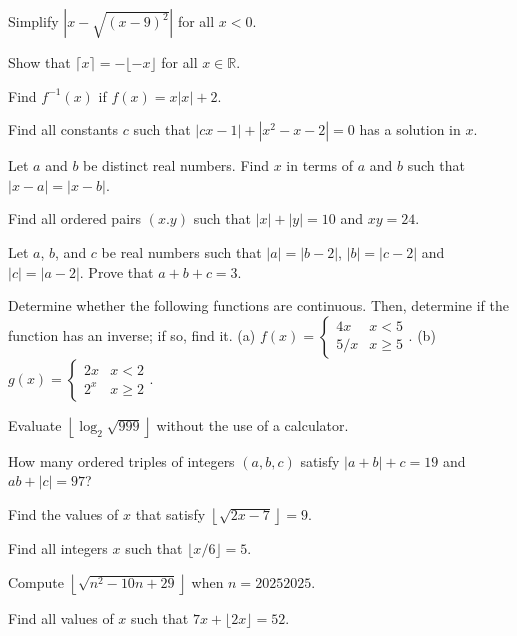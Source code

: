 \documentclass[../book.tex]{subfiles}
\begin{document}
\begin{reviewset}
\item Simplify $\left|x-\sqrt{(x-9)^2}\right|$ for all $x<0$. \vspace{3mm}
\item Show that $\lceil{x}\rceil=-\lfloor{-x}\rfloor$ for all $x\in\mathbb{R}$. \vspace{3mm}
\item Find $f^{-1}(x)$ if $f(x)=x|x|+2$. \vspace{3mm}
\item Find all constants $c$ such that $|cx-1|+|x^2-x-2|=0$ has a solution in $x$. \vspace{3mm}
\item Let $a$ and $b$ be distinct real numbers.  Find $x$ in terms of $a$ and $b$ such that $|x-a|=|x-b|$. \vspace{3mm}
\item Find all ordered pairs $(x.y)$ such that $|x|+|y|=10$ and $xy=24$. \vspace{3mm}
\item Let $a$, $b$, and $c$ be real numbers such that $|a|=|b-2|$, $|b|=|c-2|$ and $|c|=|a-2|$.  Prove that $a+b+c=3$.  \vspace{3mm}
\item Determine whether the following functions are continuous. Then, determine if the function has an inverse; if so, find it. \newline
(a) $f(x)=\begin{cases} 4x & x<5 \\ 5/x & x\geq 5 \end{cases}$. \hspace{30mm}
(b) $g(x)=\begin{cases} 2x & x<2 \\ 2^x & x\geq 2 \end{cases}$. \vspace{3mm}
\item Evaluate $\left\lfloor{\log_2\sqrt{999}}\right\rfloor$ without the use of a calculator.  \vspace{3mm}
\item How many ordered triples of integers $(a,b,c)$ satisfy $|a+b|+c=19$ and $ab+|c|=97$? \vspace{3mm}
\item Find the values of $x$ that satisfy $\left\lfloor{\sqrt{2x-7}}\right\rfloor=9$. \vspace{3mm}
\item Find all integers $x$ such that $\lfloor{x/6}\rfloor=5$. \vspace{3mm}
\item Compute $\left\lfloor{\sqrt{n^2-10n+29}}\right\rfloor$ when $n=20252025$. \vspace{3mm}
\item Find all values of $x$ such that $7x+\lfloor{2x}\rfloor=52$. \vspace{3mm}
\end{reviewset}
\end{document}
